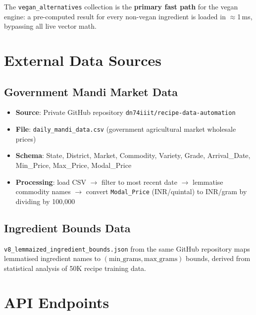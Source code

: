 \documentclass[12pt, a4paper]{article}
\begin{document}
\noindent The \texttt{vegan\_alternatives} collection is the \textbf{primary fast path} for
the vegan engine: a pre-computed result for every non-vegan ingredient is loaded in $\approx$1\,ms,
bypassing all live vector math.

\section{External Data Sources}

\subsection{Government Mandi Market Data}

\begin{itemize}
  \item \textbf{Source}: Private GitHub repository \texttt{dn74iiit/recipe-data-automation}
  \item \textbf{File}: \texttt{daily\_mandi\_data.csv} (government agricultural market wholesale prices)
  \item \textbf{Schema}: State, District, Market, Commodity, Variety, Grade, Arrival\_Date, Min\_Price, Max\_Price, Modal\_Price
  \item \textbf{Processing}: load CSV $\rightarrow$ filter to most recent date $\rightarrow$ lemmatise commodity names $\rightarrow$ convert \texttt{Modal\_Price} (INR/quintal) to INR/gram by dividing by 100,000
\end{itemize}

\subsection{Ingredient Bounds Data}

\texttt{v8\_lemmaized\_ingredient\_bounds.json} from the same GitHub repository maps
lemmatised ingredient names to $(\text{min\_grams}, \text{max\_grams})$ bounds, derived from
statistical analysis of 50K recipe training data.

\section{API Endpoints}
\end{document}
